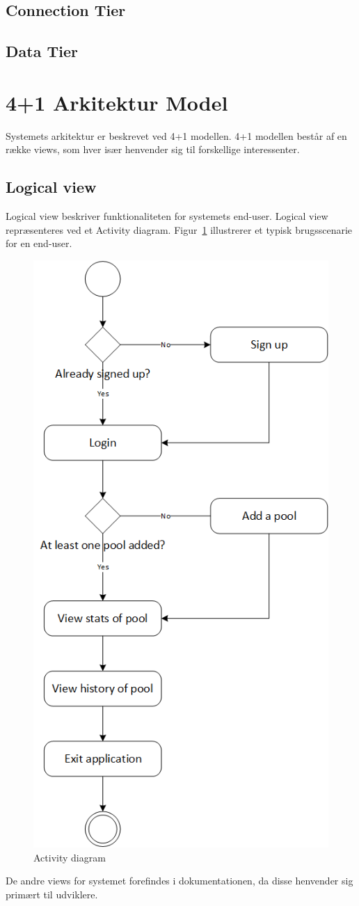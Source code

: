 \subsection{Connection Tier}\label{sec:Connectiontier}

\subsection{Data Tier}

\section{4+1 Arkitektur Model}
Systemets arkitektur er beskrevet ved 4+1 modellen. 4+1 modellen består af en række views, som hver især henvender sig til forskellige interessenter.

\subsection{Logical view}
Logical view beskriver funktionaliteten for systemets end-user. Logical view repræsenteres ved et Activity diagram. Figur~\ref{fig:ActivityDiagram} illustrerer et typisk brugsscenarie for en end-user. 
\begin{figure}
\centering
\includegraphics[width=0.55\linewidth]{figs/arkitektur/ActivityDiagram.PNG}
\caption{Activity diagram}
\label{fig:ActivityDiagram}
\end{figure}

De andre views for systemet forefindes i dokumentationen, da disse henvender sig primært til udviklere.
